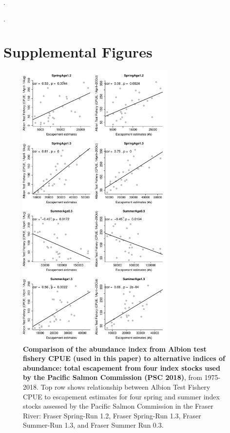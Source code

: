 \documentclass{article}
\begin{document}
.

. 

 \pagebreak
  
\section*{ }
  \pagebreak

\section* {Supplemental Figures}

\begin{figure}[!hp]
\includegraphics[width=0.7\textwidth]{../analyses/orcaphen/figures/ctcalbion.pdf}
\caption{\textbf{Comparison of the abundance index from Albion test fishery CPUE (used in this paper) to alternative indices of abundance: total escapement from four index stocks used by the Pacific Salmon Commission (PSC 2018)}, from 1975-2018. Top row shows relationship between Albion Test Fishery CPUE to escapement estimates for four spring and summer index stocks assessed by the Pacific Salmon Commission in the Fraser River: Fraser Spring-Run 1.2, Fraser Spring-Run 1.3, Fraser Summer-Run 1.3, and Fraser Summer Run 0.3.}
\label{fig:ctcalb}
\end{figure}
\end{document}
